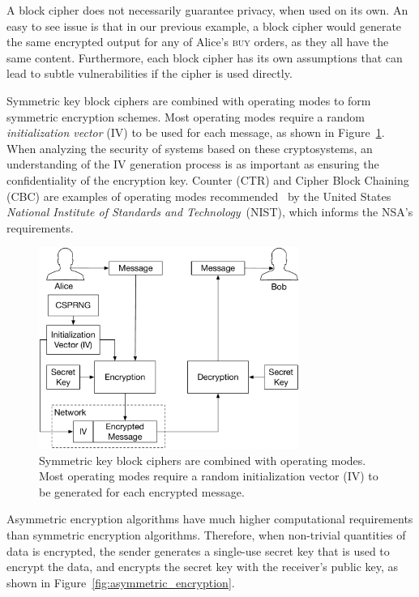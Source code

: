 A block cipher does not necessarily guarantee privacy, when used  on its own.
An easy to see issue is that in our previous example, a block cipher would
generate the same encrypted output for any of Alice's \textsc{buy} orders, as
they all have the same content. Furthermore, each block cipher has its own
assumptions that can lead to subtle vulnerabilities if the cipher is used
directly.

Symmetric key block ciphers are combined with operating modes to form symmetric
encryption schemes. Most operating modes require a random
\textit{initialization vector} (IV) to be used for each message, as shown in
Figure~\ref{fig:symmetric_encryption}. When analyzing the security of systems
based on these cryptosystems, an understanding of the IV generation process is
as important as ensuring the confidentiality of the encryption key. Counter
(CTR) and Cipher Block Chaining (CBC) are examples of operating modes
recommended~\cite{fips2001ctr} by the United States \textit{National Institute
of Standards and Technology}~(NIST), which informs the NSA's requirements.

\begin{figure}[hbt]
  \centering
  \includegraphics[width=85mm]{figures/symmetric_encryption.pdf}
  \caption{
    Symmetric key block ciphers are combined with operating modes. Most
    operating modes require a random initialization vector (IV) to be generated
    for each encrypted message.
  }
  \label{fig:symmetric_encryption}
\end{figure}


Asymmetric encryption algorithms have much higher computational requirements
than symmetric encryption algorithms. Therefore, when non-trivial quantities of
data is encrypted, the sender generates a single-use secret key that is used
to encrypt the data, and encrypts the secret key with the receiver's public
key, as shown in Figure~\ref{fig:asymmetric_encryption}.

